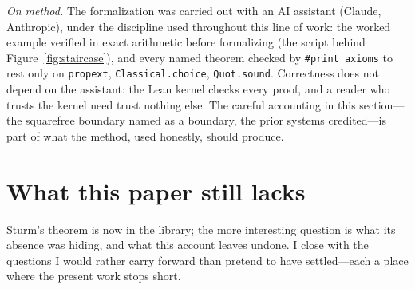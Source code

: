 \documentclass[11pt]{article}
\newcommand{\lean}[1]{\texttt{#1}}
\begin{document}
\emph{On method.} The formalization was carried out with an AI assistant (Claude, Anthropic), under
the discipline used throughout this line of work: the worked example verified in exact arithmetic
before formalizing (the script behind Figure~\ref{fig:staircase}), and every named theorem checked
by \lean{\#print axioms} to rest only on \lean{propext}, \lean{Classical.choice}, \lean{Quot.sound}.
Correctness does not depend on the assistant: the Lean kernel checks every proof, and a reader who
trusts the kernel need trust nothing else. The careful accounting in this section---the squarefree
boundary named as a boundary, the prior systems credited---is part of what the method, used
honestly, should produce.

\section{What this paper still lacks}\label{sec:questions}

Sturm's theorem is now in the library; the more interesting question is what its absence was hiding,
and what this account leaves undone. I close with the questions I would rather carry forward than
pretend to have settled---each a place where the present work stops short.
\end{document}
